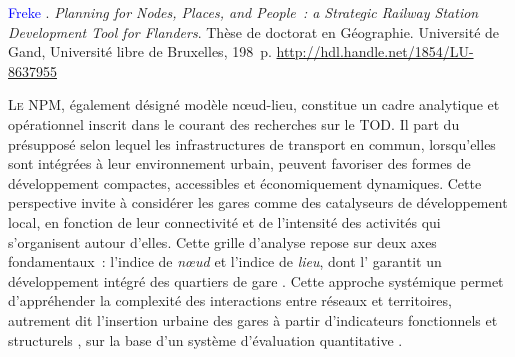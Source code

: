 \begin{refsegment}
\begin{displayquote}
\textcolor{blue}{Freke} \textcolor{blue}{\textcite[50, 83]{caset_planning_2019}}. \textsl{Planning for Nodes, Places, and People~: a Strategic Railway Station Development Tool for Flanders}. Thèse de doctorat en Géographie. Université de Gand, Université libre de Bruxelles, 198~p. \url{http://hdl.handle.net/1854/LU-8637955}
    \end{displayquote}

\lettrine[lines=3, findent=8pt, nindent=0pt]{ L}{e} \acrfull{NPM}, également désigné modèle nœud-lieu, constitue un cadre analytique et opérationnel inscrit dans le courant des recherches sur le \acrfull{TOD}. Il part du présupposé selon lequel les infrastructures de \gls{transport en commun}, lorsqu’elles sont intégrées à leur environnement urbain, peuvent favoriser des formes de développement compactes, accessibles et économiquement dynamiques. Cette perspective invite à considérer les gares comme des catalyseurs de développement local, en fonction de leur connectivité et de l’intensité des activités qui s’organisent autour d’elles. Cette grille d'analyse repose sur deux axes fondamentaux~: l’indice de \textsl{nœud} et l’indice de \textsl{lieu}, dont l’ garantit un développement intégré des quartiers de gare \textcolor{blue}{\autocite[202]{bertolini_spatial_1999}}. Cette approche systémique permet d’appréhender la complexité des interactions entre réseaux et territoires, autrement dit l'insertion urbaine des gares à partir d'indicateurs fonctionnels et structurels \textcolor{blue}{\autocite[25]{albertelli_variations_2024}}, sur la base d'un système d'évaluation quantitative \textcolor{blue}{\autocite[47]{chorus_application_2011}}.%


\end{refsegment}
